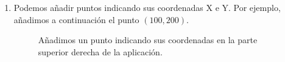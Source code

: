 \begin{enumerate}
         \item Podemos añadir puntos indicando sus coordenadas X e Y. Por ejemplo, añadimos a continuación el punto $(100,200)$.    
         \begin{figure}[H]
            \caption{Añadimos un punto indicando sus coordenadas en la parte superior derecha de la aplicación.} \label{fig:incre}
        \end{figure}
        

\end{enumerate}
